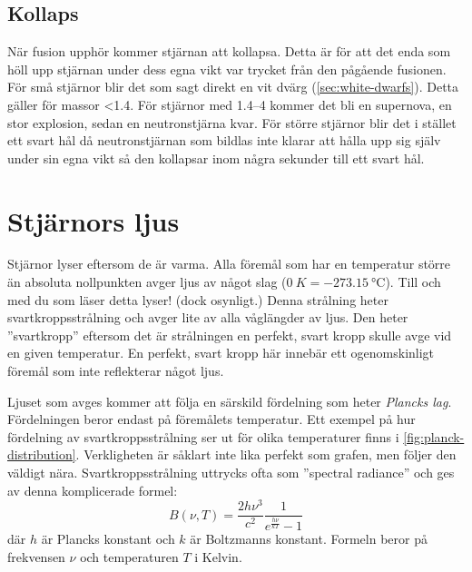 \subsection{Kollaps}
När fusion upphör kommer stjärnan att kollapsa. Detta är för att det enda som höll upp stjärnan under dess egna vikt var trycket från den pågående fusionen. För små stjärnor blir det som sagt direkt en vit dvärg (\vref{sec:white-dwarfs}). Detta gäller för massor \qty{<1.4}{\Mo}. För stjärnor med \qtyrange{1.4}{4}{\Mo} kommer det bli en supernova, en stor explosion, sedan en neutronstjärna kvar. För större stjärnor blir det i stället ett svart hål då neutronstjärnan som bildlas inte klarar att hålla upp sig själv under sin egna vikt så den kollapsar inom några sekunder till ett svart hål.


\section{Stjärnors ljus}
Stjärnor lyser eftersom de är varma. Alla föremål som har en temperatur större än absoluta nollpunkten avger ljus av något slag ($\qty{0}{K} = \qty{-273.15}{\degreeCelsius}$). Till och med du som läser detta lyser! (dock osynligt.) Denna strålning heter svartkroppsstrålning och avger lite av alla våglängder av ljus. Den heter ''svartkropp'' eftersom det är strålningen en perfekt, svart kropp skulle avge vid en given temperatur. En perfekt, svart kropp här innebär ett ogenomskinligt föremål som inte reflekterar något ljus.

Ljuset som avges kommer att följa en särskild fördelning som heter \emph{Plancks lag}. Fördelningen beror endast på föremålets temperatur. Ett exempel på hur fördelning av svartkroppsstrålning ser ut för olika temperaturer finns i \cref{fig:planck-distribution}. Verkligheten är såklart inte lika perfekt som grafen, men följer den väldigt nära. Svartkroppsstrålning uttrycks ofta som ''spectral radiance'' och ges av denna komplicerade formel:
\begin{equation}
    B(\nu, T) = \frac{2h\nu^3}{c^2} \frac{1}{e^{\frac{h\nu}{kT}} - 1}
    \label{eq:planck-distribution}
\end{equation}
där $h$ är Plancks konstant och $k$ är Boltzmanns konstant. Formeln beror på frekvensen $\nu$ och temperaturen $T$ i Kelvin.

